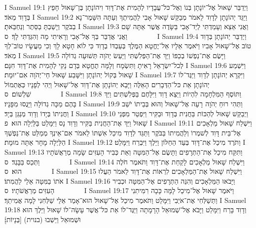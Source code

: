 I Samuel 19:1	וַיְדַבֵּר שָׁאוּל אֶל־יוֹנָתָן בְּנוֹ וְאֶל־כּל־עֲבָדָיו לְהָמִית אֶת־דָּוִד וִיהוֹנָתָן בֶּן־שָׁאוּל חָפֵץ בְּדָוִד מְאֹד׃
I Samuel 19:2	וַיַּגֵּד יְהוֹנָתָן לְדָוִד לֵאמֹר מְבַקֵּשׁ שָׁאוּל אָבִי לַהֲמִיתֶךָ וְעַתָּה הִשָּׁמֶר־נָא בַבֹּקֶר וְיָשַׁבְתָּ בַסֵּתֶר וְנַחְבֵּאתָ׃
I Samuel 19:3	וַאֲנִי אֵצֵא וְעָמַדְתִּי לְיַד־אָבִי בַּשָּׂדֶה אֲשֶׁר אַתָּה שָׁם וַאֲנִי אֲדַבֵּר בְּךָ אֶל־אָבִי וְרָאִיתִי מָה וְהִגַּדְתִּי לָךְ׃ {ס}        
I Samuel 19:4	וַיְדַבֵּר יְהוֹנָתָן בְּדָוִד טוֹב אֶל־שָׁאוּל אָבִיו וַיֹּאמֶר אֵלָיו אַל־יֶחֱטָא הַמֶּלֶךְ בְּעַבְדּוֹ בְדָוִד כִּי לוֹא חָטָא לָךְ וְכִי מַעֲשָׂיו טוֹב־לְךָ מְאֹד׃
I Samuel 19:5	וַיָּשֶׂם אֶת־נַפְשׁוֹ בְכַפּוֹ וַיַּךְ אֶת־הַפְּלִשְׁתִּי וַיַּעַשׂ יְהֹוָה תְּשׁוּעָה גְדוֹלָה לְכל־יִשְׂרָאֵל רָאִיתָ וַתִּשְׂמָח וְלָמָּה תֶחֱטָא בְּדָם נָקִי לְהָמִית אֶת־דָּוִד חִנָּם׃
I Samuel 19:6	וַיִּשְׁמַע שָׁאוּל בְּקוֹל יְהוֹנָתָן וַיִּשָּׁבַע שָׁאוּל חַי־יְהֹוָה אִם־יוּמָת׃
I Samuel 19:7	וַיִּקְרָא יְהוֹנָתָן לְדָוִד וַיַּגֶּד־לוֹ יְהוֹנָתָן אֵת כּל־הַדְּבָרִים הָאֵלֶּה וַיָּבֵא יְהוֹנָתָן אֶת־דָּוִד אֶל־שָׁאוּל וַיְהִי לְפָנָיו כְּאֶתְמוֹל שִׁלְשׁוֹם׃ {ס}        
I Samuel 19:8	וַתּוֹסֶף הַמִּלְחָמָה לִהְיוֹת וַיֵּצֵא דָוִד וַיִּלָּחֶם בַּפְּלִשְׁתִּים וַיַּךְ בָּהֶם מַכָּה גְדוֹלָה וַיָּנֻסוּ מִפָּנָיו׃
I Samuel 19:9	וַתְּהִי רוּחַ יְהֹוָה  רָעָה אֶל־שָׁאוּל וְהוּא בְּבֵיתוֹ יֹשֵׁב וַחֲנִיתוֹ בְּיָדוֹ וְדָוִד מְנַגֵּן בְּיָד׃
I Samuel 19:10	וַיְבַקֵּשׁ שָׁאוּל לְהַכּוֹת בַּחֲנִית בְּדָוִד וּבַקִּיר וַיִּפְטַר מִפְּנֵי שָׁאוּל וַיַּךְ אֶת־הַחֲנִית בַּקִּיר וְדָוִד נָס וַיִּמָּלֵט בַּלַּיְלָה הוּא׃ {פ}
I Samuel 19:11	וַיִּשְׁלַח שָׁאוּל מַלְאָכִים אֶל־בֵּית דָּוִד לְשׁמְרוֹ וְלַהֲמִיתוֹ בַּבֹּקֶר וַתַּגֵּד לְדָוִד מִיכַל אִשְׁתּוֹ לֵאמֹר אִם־אֵינְךָ מְמַלֵּט אֶת־נַפְשְׁךָ הַלַּיְלָה מָחָר אַתָּה מוּמָת׃
I Samuel 19:12	וַתֹּרֶד מִיכַל אֶת־דָּוִד בְּעַד הַחַלּוֹן וַיֵּלֶךְ וַיִּבְרַח וַיִּמָּלֵט׃
I Samuel 19:13	וַתִּקַּח מִיכַל אֶת־הַתְּרָפִים וַתָּשֶׂם אֶל־הַמִּטָּה וְאֵת כְּבִיר הָעִזִּים שָׂמָה מְרַאֲשֹׁתָיו וַתְּכַס בַּבָּגֶד׃ {ס}        
I Samuel 19:14	וַיִּשְׁלַח שָׁאוּל מַלְאָכִים לָקַחַת אֶת־דָּוִד וַתֹּאמֶר חֹלֶה הוּא׃ {ס}        
I Samuel 19:15	וַיִּשְׁלַח שָׁאוּל אֶת־הַמַּלְאָכִים לִרְאוֹת אֶת־דָּוִד לֵאמֹר הַעֲלוּ אֹתוֹ בַמִּטָּה אֵלַי לַהֲמִתוֹ׃
I Samuel 19:16	וַיָּבֹאוּ הַמַּלְאָכִים וְהִנֵּה הַתְּרָפִים אֶל־הַמִּטָּה וּכְבִיר הָעִזִּים מְרַאֲשֹׁתָיו׃ {ס}        
I Samuel 19:17	וַיֹּאמֶר שָׁאוּל אֶל־מִיכַל לָמָּה כָּכָה רִמִּיתִנִי וַתְּשַׁלְּחִי אֶת־אֹיְבִי וַיִּמָּלֵט וַתֹּאמֶר מִיכַל אֶל־שָׁאוּל הוּא־אָמַר אֵלַי שַׁלְּחִנִי לָמָה אֲמִיתֵךְ׃
I Samuel 19:18	וְדָוִד בָּרַח וַיִּמָּלֵט וַיָּבֹא אֶל־שְׁמוּאֵל הָרָמָתָה וַיַּגֶּד־לוֹ אֵת כּל־אֲשֶׁר עָשָׂה־לוֹ שָׁאוּל וַיֵּלֶךְ הוּא וּשְׁמוּאֵל וַיֵּשְׁבוּ (בנוית) [בְּנָיוֹת]׃
